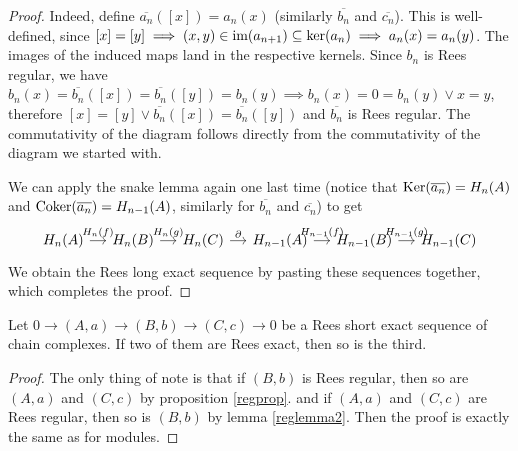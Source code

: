 \begin{proof}[Proof]
    Indeed, define $\overline{a_n}([x]) = a_n(x)$ (similarly $\overline{b_n}$ and $\overline{c_n}$). This is well-defined, since
    $[x]=[y] \implies (x,y)\in\text{im}(a_{n+1})\subseteq\mathrm{ker}(a_n) \implies a_n(x)=a_n(y)$. The images of the induced 
    maps land in the respective kernels. Since $b_n$ is Rees regular, we have
    $b_n(x)=\overline{b_n}([x])=\overline{b_n}([y])=b_n(y) \implies b_n(x)=0=b_n(y) \lor x=y$, therefore $[x]=[y] \lor \overline{b_n}([x])=\overline{b_n}([y])$
    and $\overline{b_n}$ is Rees regular. The commutativity of the diagram follows directly from the commutativity of the diagram
    we started with.\par 
    We can apply the snake lemma again one last time (notice that $\mathrm{Ker}(\overline{a_n}) = H_n(A)$ and $\mathrm{Coker}(\overline{a_n}) = H_{n-1}(A)$, similarly
    for $\overline{b_n}$ and $\overline{c_n}$) to get 
    \[\begin{tikzcd}[sep=small]
        {H_{n}(A)} & {H_n(B)} & {H_n(C)} & {H_{n-1}(A)} & {H_{n-1}(B)} & {H_{n-1}(C)}
        \arrow["{H_n(f)}", from=1-1, to=1-2]
        \arrow["{H_n(g)}", from=1-2, to=1-3]
        \arrow["\partial", from=1-3, to=1-4]
        \arrow["{H_{n-1}(f)}", from=1-4, to=1-5]
        \arrow["{H_{n-1}(g)}", from=1-5, to=1-6]
    \end{tikzcd}\]
    We obtain the Rees long exact sequence by pasting these sequences together, which completes the proof.
\end{proof}
\begin{corollary}
    Let $0 \to (A,a) \to (B,b) \to (C,c) \to 0$ be a Rees short exact sequence of chain complexes. If two of them are 
    Rees exact, then so is the third.
\end{corollary}
\begin{proof}[Proof]
    The only thing of note is that if $(B,b)$ is Rees regular, then so are $(A,a)$ and $(C,c)$ by proposition \ref{regprop}. and 
    if $(A,a)$ and $(C,c)$ are Rees regular, then so is $(B,b)$ by lemma \ref{reglemma2}. Then the proof is exactly the same as 
    for modules.
\end{proof}
